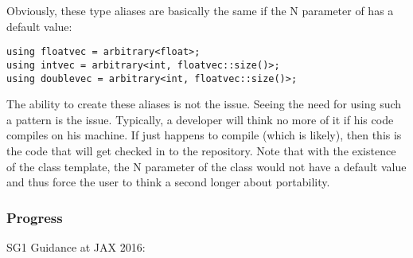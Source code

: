 Obviously, these type aliases are basically the same if the \code N parameter of  has a default value:
\smallskip\begin{lstlisting}[style=Vc]
using floatvec = arbitrary<float>;
using intvec = arbitrary<int, floatvec::size()>;
using doublevec = arbitrary<int, floatvec::size()>;
\end{lstlisting}
The ability to create these aliases is not the issue.
Seeing the need for using such a pattern is the issue.
Typically, a developer will think no more of it if his code compiles on his machine.
If  just happens to compile (which is likely), then this is the code that will get checked in to the repository.
Note that with the existence of the  class template, the \code N parameter of the  class would not have a default value and thus force the user to think a second longer about portability.

\subsubsection{Progress}\label{sec:fixedsize progress}
\newcommand\common[2]{\code{\textit{common}(\type{#1}, \type{#2})}}
\newcommand\commonabi[3]{\code{\textit{commonabi}(\type{#1}, \type{#2}, \type{#3})}}

SG1 Guidance at JAX 2016:\\

